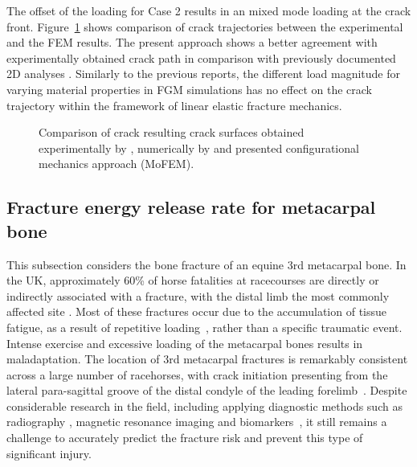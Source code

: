 \documentclass[onecolumn]{svjour3}
\begin{document}
The offset of the loading for Case 2 results in an mixed mode loading at the crack front.
Figure~\ref{fig:fgm_crack_path_comapre} shows comparison of crack trajectories between the experimental and the FEM results. The present approach shows a better agreement with experimentally obtained crack path in comparison with previously documented 2D analyses \cite{kim2004simulation}. Similarly to the previous reports, the different load magnitude for varying material properties in FGM simulations has no effect on the crack trajectory within the framework of linear elastic fracture mechanics. 
% 
\begin{figure}
		\centering
		\caption{Comparison of crack resulting crack surfaces obtained experimentally by \cite{galvez1996crack}, numerically by \citep{kim2004simulation} and presented configurational mechanics approach (MoFEM).}
		\label{fig:fgm_crack_path_comapre}
\end{figure}
% 
% 
\subsection{Fracture energy release rate for metacarpal bone} 
\label{sec:mc3_release_eng}
% 
This subsection considers the bone fracture of an equine 3rd metacarpal bone. 
In the UK, approximately 60\% of horse fatalities at racecourses are directly or indirectly associated with a fracture, with the distal limb the most commonly affected site \cite{parkin2004risk}.
Most of these fractures occur due to the accumulation of tissue fatigue, as a result of repetitive loading~\cite{Parkin2005}, rather than a specific traumatic event. 
Intense exercise and excessive loading of the metacarpal bones results in maladaptation. 
The location of 3rd metacarpal fractures is remarkably consistent across a large number of racehorses,  with crack initiation presenting from 
the lateral para-sagittal groove of the distal condyle of the leading forelimb~\cite{jacklin2012frequency, parkin2006analysis}.
Despite considerable research in the field, including applying diagnostic methods such as radiography 
\cite{bogers2016quantitative, crijns2014intramodality, loughridge2017qualitative}, magnetic resonance imaging 
\cite{tranquille2017MRI} and biomarkers~\cite{mcilwraith2005use}, it still remains a challenge to accurately predict the fracture risk and prevent this type of significant injury.
\end{document}
